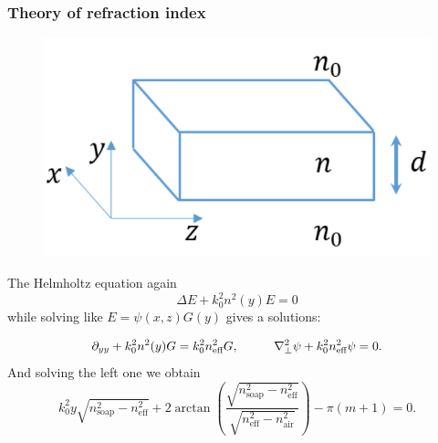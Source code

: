 \frametitle{Theory of refraction index}
\begin{minipage}{0.35\textwidth}
    \begin{figure}[h]
    \centering
    \includegraphics[width=1\textwidth]{images/nature_scheme.png}
\end{figure}
\end{minipage}
\hfill
\begin{minipage}{0.55\textwidth}
	The Helmholtz equation again
	\begin{equation*}
		\Delta E + k_0^2 n^2(y) E = 0
	\end{equation*}    
	while solving like $E = \psi(x,z) G(y)$ gives a solutions:
\end{minipage}
	\begin{equation*}
		\partial_{y y} + k_0^2 n^2(y) G = k_0^2 n^2_{\text{eff}} G,
	\hspace{1 cm}
		\nabla_{\perp}^2 \psi + k_0^2 n_\text{eff}^2 \psi = 0.
	\end{equation*}
	And solving the left one we obtain
	\begin{equation*}
		k_0^2 y \sqrt{n_\text{soap}^2 - n_\text{eff}^2} + 2 \arctan\left(\frac{\sqrt{n_\text{soap}^2 - n_\text{eff}^2}}{\sqrt{n_\text{eff}^2 - n_\text{air}^2}}\right) - \pi(m+1) = 0.
	\end{equation*}
